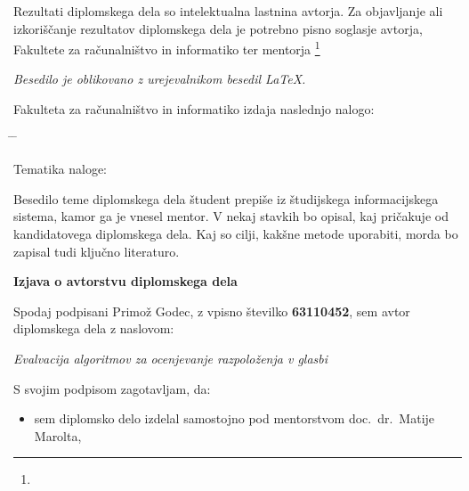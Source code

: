 \documentclass[a4paper, 12pt]{book}
\newcommand{\ttitle}{Evalvacija algoritmov za ocenjevanje razpoloženja v glasbi}
\newcommand{\clearemptydoublepage}{\newpage{\pagestyle{empty}\cleardoublepage}}
\begin{document}
\thispagestyle{empty}
\vspace*{8cm}
{\small \noindent
Rezultati diplomskega dela so intelektualna lastnina avtorja.
Za objavljanje ali izkoriščanje rezultatov di\-plom\-ske\-ga dela je potrebno pisno soglasje avtorja, Fakultete za ra\-ču\-nal\-niš\-tvo in
informatiko ter mentorja%
\footnote{}


\begin{center}
\mbox{}\vfill
\emph{Besedilo je oblikovano z urejevalnikom besedil \LaTeX.}
\end{center}
\clearemptydoublepage

\thispagestyle{empty}
\vspace*{4cm}

\noindent
Fakulteta za računalništvo in informatiko izdaja naslednjo nalogo:
\medskip
\begin{tabbing}
\hspace{32mm}\= \hspace{6cm} \= \kill




Tematika naloge:
\end{tabbing}
Besedilo teme diplomskega dela študent prepiše iz študijskega informacijskega sistema, kamor ga je vnesel mentor. V nekaj stavkih bo opisal, kaj pričakuje od kandidatovega diplomskega dela. Kaj so cilji, kakšne metode uporabiti, morda bo zapisal tudi ključno literaturo.
\vspace{15mm}






\vspace{2cm}

\clearemptydoublepage

\vspace*{1cm}
\begin{center}
{\Large \textbf{\sc Izjava o avtorstvu diplomskega dela}}
\end{center}

\vspace{1cm}
\noindent Spodaj podpisani Primož Godec,
z vpisno številko \textbf{63110452}, sem avtor  diplomskega dela z naslovom:

\vspace{0.5cm}
\emph{\ttitle}

\vspace{1.5cm}
\noindent S svojim podpisom zagotavljam, da:
\begin{itemize}
	\item sem diplomsko delo izdelal samostojno pod mentorstvom
		doc.\ dr.\ Matije Marolta,


\end{itemize}}
\end{document}
